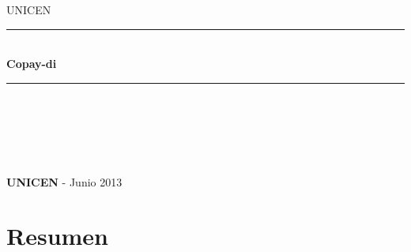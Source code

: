 \documentclass[12pt,a4paper,oneside,spanish]{report}
\newcommand{\HRule}{\rule{\linewidth}{0.5mm}}
\begin{document}
\begin{titlepage}
\begin{center}


\textsc{\LARGE UNICEN}\\[1.5cm]



\HRule \\[0.4cm]
{ \huge \bfseries Copay-di}\\[0.4cm]

\HRule \\[0.4cm]


\begin{center}
\textbf{}
\end{center}
~\\[3.5cm]


\textit{}


~\\[0.4cm]
\textit{} \textbf{} 

\vfill

{\large \textbf{UNICEN} - Junio 2013}

\end{center}
\end{titlepage}

\section*{Resumen}
\end{document}

